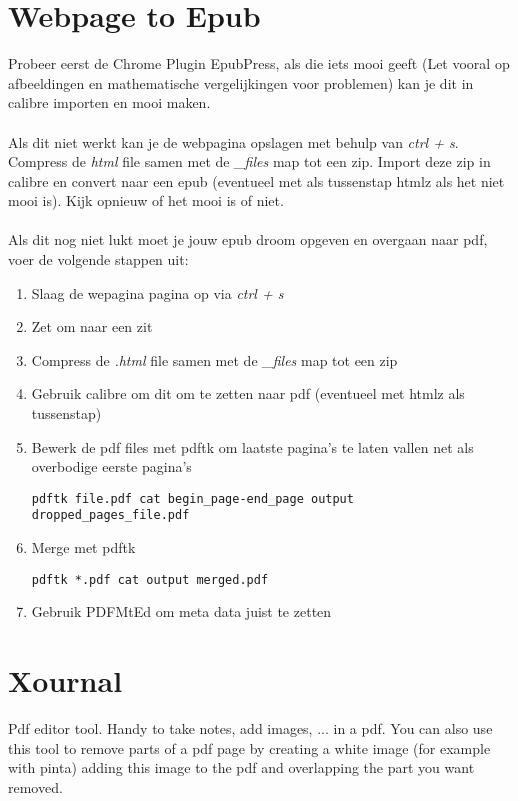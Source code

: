\documentclass[a4paper]{article}
\begin{document}
\section{Webpage to Epub}
Probeer eerst de Chrome Plugin EpubPress, als die iets mooi geeft (Let vooral op afbeeldingen en mathematische vergelijkingen voor problemen) kan je dit in calibre importen en mooi maken.
\\
\\
Als dit niet werkt kan je de webpagina opslagen met behulp van \emph{ctrl + s}. Compress de \emph{html} file samen met de \emph{\_files} map tot een zip. Import deze zip in calibre en convert naar een epub (eventueel met als tussenstap htmlz als het niet mooi is). Kijk opnieuw of het mooi is of niet.
\\
\\
Als dit nog niet lukt moet je jouw epub droom opgeven en overgaan naar pdf, voer de volgende stappen uit:
\begin{enumerate}
\item Slaag de wepagina pagina op via \emph{ctrl + s}
\item Zet om naar een zit
\item Compress de \emph{.html} file samen met de \emph{\_files} map tot een zip
\item Gebruik calibre om dit om te zetten naar pdf (eventueel met htmlz als tussenstap)
\item Bewerk de pdf files met pdftk om laatste pagina's te laten vallen net als overbodige eerste pagina's 
\begin{lstlisting}
pdftk file.pdf cat begin_page-end_page output dropped_pages_file.pdf
\end{lstlisting}
\item Merge met pdftk 
\begin{lstlisting}
pdftk *.pdf cat output merged.pdf
\end{lstlisting}
\item Gebruik PDFMtEd om meta data juist te zetten
\end{enumerate}

\section{Xournal}
Pdf editor tool. Handy to take notes, add images, ... in a pdf. You can also use this tool to remove parts of a pdf page by creating a white image (for example with pinta) adding this image to the pdf and overlapping the part you want removed.
\end{document}
